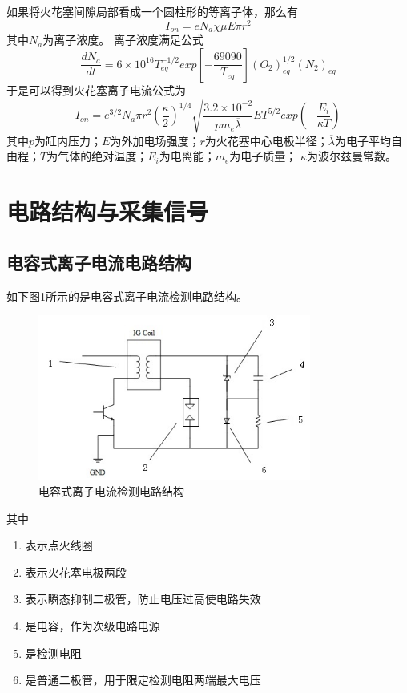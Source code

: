 如果将火花塞间隙局部看成一个圆柱形的等离子体，那么有
\begin{equation}
	I_{on}=eN_{a}\chi \mu E\pi r^{2}
\end{equation}
其中$N_{a}$为离子浓度。
离子浓度满足公式
\begin{equation}
	\frac{dN_{a}}{dt}=6\times10^{16}T_{eq}^{-1/2}exp[-\frac{69090}{T_{eq}}](O_{2})_{eq}^{1/2}(N_{2})_{eq}
\end{equation}
于是可以得到火花塞离子电流公式为
\begin{equation}
	\label{eqn:ion_eqn}
	I_{on}=e^{3/2}N_{a}\pi r^{2}(\frac{\kappa}{2})^{1/4}\sqrt{\frac{3.2\times10^{-2}}{pm_{e}\overline{\lambda}}ET^{5/2}exp(-\frac{E_{i}}{\kappa T})}
\end{equation}
其中$p$为缸内压力；$E$为外加电场强度；$r$为火花塞中心电极半径；$\overline{\lambda}$为电子平均自由程；$T$为气体的绝对温度；$E_{i}$为电离能；$m_{e}$为电子质量；
$\kappa$为波尔兹曼常数。
\section{电路结构与采集信号}
\subsection{电容式离子电流电路结构}
如下图\ref{fig:ionstruct}所示的是电容式离子电流检测电路结构。
\begin{figure}[!h]
	\centering
	\includegraphics[width=0.8\textwidth]{thesis_figure/ion_struct}
	\caption{电容式离子电流检测电路结构}
	\label{fig:ionstruct}
\end{figure}
其中
\begin{enumerate}[1]
\item 表示点火线圈
\item 表示火花塞电极两段
\item 表示瞬态抑制二极管，防止电压过高使电路失效
\item 是电容，作为次级电路电源
\item 是检测电阻
\item 是普通二极管，用于限定检测电阻两端最大电压
\end{enumerate}
